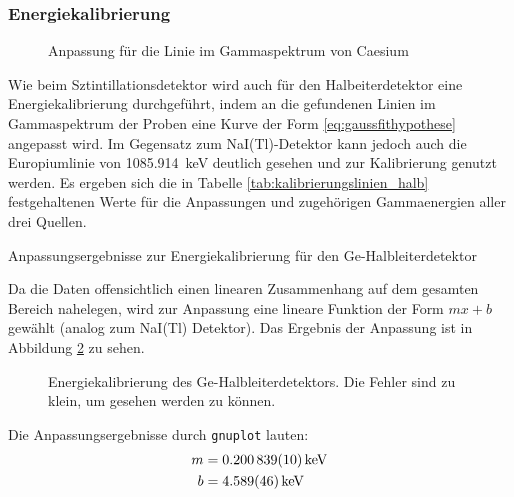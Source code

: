 \documentclass[11pt, a4paper]{article}
\numberwithin{equation}{section}
\begin{document}
\subsubsection{Energiekalibrierung}
\label{sec:kalibrierung_halb}
\begin{figure}[ht]
	\centering
	\resizebox{0.85\textwidth}{!}{
		
	}
	\caption{Anpassung für die Linie im Gammaspektrum von Caesium}
	\label{fig:fit_caesium}
\end{figure}
Wie beim Sztintillationsdetektor wird auch für den Halbeiterdetektor eine Energiekalibrierung durchgeführt, indem an die gefundenen Linien im Gammaspektrum der Proben eine Kurve der Form \eqref{eq:gaussfithypothese} angepasst wird.
Im Gegensatz zum NaI(Tl)-Detektor kann jedoch auch die Europiumlinie von \SI{1085.914}{\kilo\electronvolt} deutlich gesehen und zur Kalibrierung genutzt werden.
Es ergeben sich die in Tabelle \ref{tab:kalibrierungslinien_halb} festgehaltenen Werte für die Anpassungen und zugehörigen Gammaenergien aller drei Quellen.
\begin{table}[ht]
	\centering
	\resizebox{\textwidth}{!}{
	
	}
	\caption{Anpassungsergebnisse zur Energiekalibrierung für den Ge-Halbleiterdetektor}
	\label{tab:kalibrierungslinien_halb}
\end{table}
Da die Daten offensichtlich einen linearen Zusammenhang auf dem gesamten Bereich nahelegen, wird zur Anpassung eine lineare Funktion der Form $mx + b$ gewählt (analog zum NaI(Tl) Detektor).
Das Ergebnis der Anpassung ist in Abbildung \ref{fig:kalibrierung_halb} zu sehen.
\begin{figure}[ht]
	\centering
	
	\caption{Energiekalibrierung des Ge-Halbleiterdetektors. Die Fehler sind zu klein, um gesehen werden zu können.}
	\label{fig:kalibrierung_halb}
\end{figure}  
Die Anpassungsergebnisse durch \texttt{gnuplot} lauten:
\begin{align}
	m &= \SI{0.200839 +- 0.000010}{\kilo\electronvolt} \\
	b &= \SI{4.589 +- 0.046}{\kilo\electronvolt}
	\label{eq:kalibrierung_halb}
\end{align}
\end{document}
